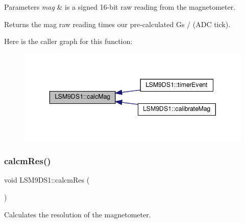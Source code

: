 \begin{DoxyParams}{Parameters}
{\em mag} & is a signed 16-\/bit raw reading from the magnetometer. \\
\hline
\end{DoxyParams}
\begin{DoxyReturn}{Returns}
the mag raw reading times our pre-\/calculated Gs / (A\+DC tick). 
\end{DoxyReturn}
Here is the caller graph for this function\+:\nopagebreak
\begin{figure}[H]
\begin{center}
\leavevmode
\includegraphics[width=343pt]{classLSM9DS1_a7d0b0740497b1a10cd3e46a282a143ec_icgraph}
\end{center}
\end{figure}
\mbox{\label{classLSM9DS1_a830dfc95c7e2d8524720d78357b053cb}} 
\subsubsection{\texorpdfstring{calcm\+Res()}{calcmRes()}}
{\footnotesize\ttfamily void L\+S\+M9\+D\+S1\+::calcm\+Res (\begin{DoxyParamCaption}{ }\end{DoxyParamCaption})\hspace{0.3cm}{\ttfamily [protected]}}



Calculates the resolution of the magnetometer. 

